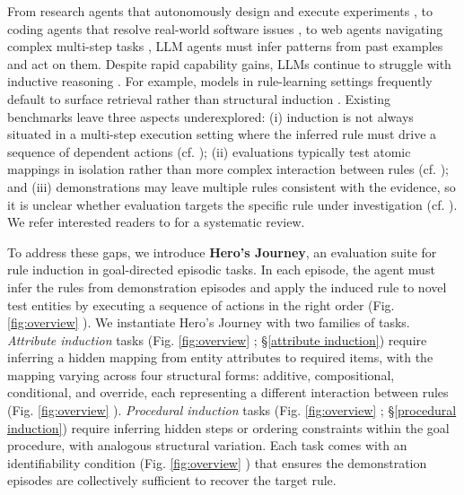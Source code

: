 \documentclass[11pt]{article}
\newcommand{\AS}{{\sc Hero's Journey}\xspace}
\DeclareRobustCommand{\cnum}[1]{%
  \tikz[baseline=(c.base)]{%
    \node[circle,fill=black,inner sep=1pt,
          font=\scriptsize\bfseries\color{white}] (c) {#1};%
  }%
}
\begin{document}
From research agents that autonomously design and execute experiments \citep{lu2024aiscientist}, to coding agents that resolve real-world software issues \citep{jimenez2024swebench}, to web agents navigating complex multi-step tasks \citep{zhou2024webarena},
LLM agents must infer patterns from past examples and act on them. 
 Despite rapid capability gains, LLMs continue to struggle with inductive reasoning \citep{li2025mirage}. For example, models in rule-learning settings frequently default to surface retrieval rather than structural induction \citep{he2024idea}. Existing benchmarks leave three aspects underexplored: (i) induction is not always situated in a multi-step execution setting where the inferred rule must drive a sequence of dependent actions (cf. \citealt{chollet2019arc}); (ii) evaluations typically test atomic mappings in isolation rather than more complex interaction between rules (cf. \citealt{rule2020child}); and (iii) demonstrations may leave multiple rules consistent with the evidence, so it is unclear whether evaluation targets the specific rule under
investigation (cf. \citealt{qiu-etal-2024-phenomenal, he2024idea}). We refer interested readers to \citet{chen2025survey} for a systematic review.

To address these gaps, we introduce \textbf{\AS}, an evaluation suite for rule induction in goal-directed episodic tasks.
In each episode, the agent must infer the rules from demonstration episodes and apply the induced rule to novel test entities by executing a sequence of actions in the right order (Fig. \ref{fig:overview} \cnum{5}). We instantiate \AS with two families of tasks.
\textit{Attribute induction} tasks (Fig. \ref{fig:overview} \cnum{2}; \S\ref{attribute induction}) require inferring a hidden mapping from entity attributes to required items, with the mapping varying across four structural forms: additive, compositional, conditional, and override, each representing a different interaction between rules (Fig. \ref{fig:overview} \cnum{1}).
\textit{Procedural induction} tasks (Fig. \ref{fig:overview} \cnum{3}; \S\ref{procedural induction}) require inferring hidden steps or ordering constraints within the goal procedure, with analogous structural variation. Each task comes with an identifiability condition (Fig. \ref{fig:overview} \cnum{4}) that ensures the demonstration episodes are collectively sufficient to recover the target rule.
\end{document}
